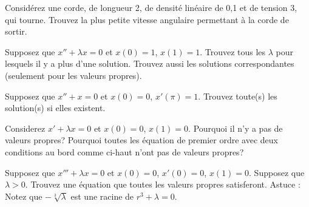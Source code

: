 \setcounter{exercise}{100}

\begin{exercise}
Considérez une corde, de longueur 2, de densité linéaire de 0,1 et de tension 3,  qui tourne. Trouvez la plus petite vitesse angulaire permettant à la corde de sortir. 
\end{exercise}

\begin{exercise}
Supposez que $x'' + \lambda x = 0$ et $x(0)=1$, $x(1) = 1$.
Trouvez tous les $\lambda$ pour lesquels il y a plus d'une solution. Trouvez aussi les solutions correspondantes (seulement pour les valeurs propres). 
\end{exercise}

\begin{exercise}
Supposez que $x'' + x = 0$ et $x(0)=0$, $x'(\pi) = 1$.
Trouvez toute(s) les solution(s) si elles existent.  
\end{exercise}

\begin{exercise}
Considerez
$x' + \lambda x = 0$ et $x(0)=0$, $x(1) = 0$.  Pourquoi il n'y a pas de valeurs propres? Pourquoi toutes les équation de premier ordre avec deux conditions au bord comme ci-haut n'ont pas de valeurs propres? 
\end{exercise}

\begin{exercise}[défi]
Supposez que $x''' + \lambda x = 0$ et $x(0)=0$, $x'(0) = 0$, $x(1) = 0$.
Supposez que  $\lambda > 0$.  Trouvez une équation que toutes les valeurs propres satisferont. 
Astuce : Notez que $-\sqrt[3]{\lambda}$ est une racine de $r^3+\lambda = 0$.
\end{exercise}


